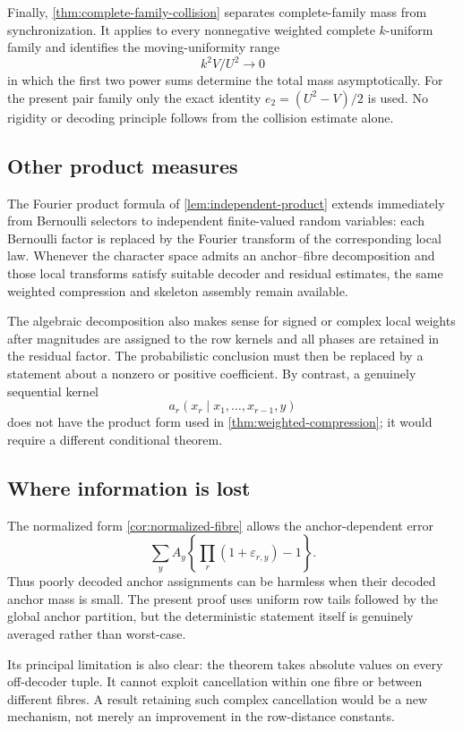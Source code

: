 Finally, \cref{thm:complete-family-collision} separates complete-family mass from synchronization.  It applies to every nonnegative weighted complete $k$-uniform family and identifies the moving-uniformity range
\[
 k^2V/U^2\longrightarrow0
\]
in which the first two power sums determine the total mass asymptotically.  For the present pair family only the exact identity $e_2=(U^2-V)/2$ is used.  No rigidity or decoding principle follows from the collision estimate alone.

\subsection{Other product measures}

The Fourier product formula of \cref{lem:independent-product} extends immediately from Bernoulli selectors to independent finite-valued random variables: each Bernoulli factor is replaced by the Fourier transform of the corresponding local law.  Whenever the character space admits an anchor--fibre decomposition and those local transforms satisfy suitable decoder and residual estimates, the same weighted compression and skeleton assembly remain available.

The algebraic decomposition also makes sense for signed or complex local weights after magnitudes are assigned to the row kernels and all phases are retained in the residual factor.  The probabilistic conclusion must then be replaced by a statement about a nonzero or positive coefficient.  By contrast, a genuinely sequential kernel
\[
 a_r(x_r\mid x_1,\ldots,x_{r-1},y)
\]
does not have the product form used in \cref{thm:weighted-compression}; it would require a different conditional theorem.

\subsection{Where information is lost}

The normalized form \cref{cor:normalized-fibre} allows the anchor-dependent error
\[
 \sum_yA_y\left\{\prod_r(1+\varepsilon_{r,y})-1\right\}.
\]
Thus poorly decoded anchor assignments can be harmless when their decoded anchor mass is small.  The present proof uses uniform row tails followed by the global anchor partition, but the deterministic statement itself is genuinely averaged rather than worst-case.

Its principal limitation is also clear: the theorem takes absolute values on every off-decoder tuple.  It cannot exploit cancellation within one fibre or between different fibres.  A result retaining such complex cancellation would be a new mechanism, not merely an improvement in the row-distance constants.


